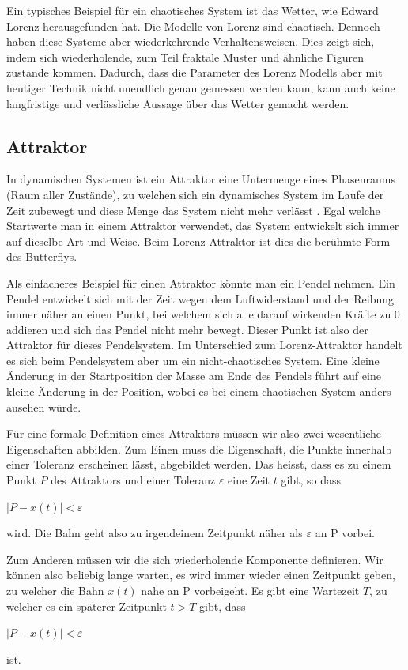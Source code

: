 Ein typisches Beispiel für ein chaotisches System ist das Wetter, wie Edward Lorenz herausgefunden hat. Die Modelle von Lorenz sind chaotisch. Dennoch haben diese Systeme aber	 wiederkehrende Verhaltensweisen. Dies zeigt sich, indem sich wiederholende, zum Teil fraktale Muster und ähnliche Figuren zustande kommen. Dadurch, dass die Parameter des Lorenz Modells aber mit heutiger Technik nicht unendlich genau gemessen werden kann, kann auch keine langfristige und verlässliche Aussage über das Wetter gemacht werden. 

\subsection{Attraktor}
In dynamischen Systemen ist ein Attraktor eine Untermenge eines Phasenraums (Raum aller Zustände), zu welchen sich ein dynamisches System im Laufe der Zeit zubewegt und diese Menge das System nicht mehr verlässt \cite{wikiattraktor}. 
Egal welche Startwerte man in einem Attraktor verwendet, das System entwickelt sich immer auf dieselbe Art und Weise. Beim Lorenz Attraktor ist dies die berühmte Form des Butterflys. 

Als einfacheres Beispiel für einen Attraktor könnte man ein Pendel nehmen. Ein Pendel entwickelt sich mit der Zeit wegen dem Luftwiderstand und der Reibung immer näher an einen Punkt, bei welchem sich alle darauf wirkenden Kräfte zu 0 addieren und sich das Pendel nicht mehr bewegt. Dieser Punkt ist also der Attraktor für dieses Pendelsystem. Im Unterschied zum Lorenz-Attraktor handelt es sich beim Pendelsystem aber um ein nicht-chaotisches System. Eine kleine Änderung in der Startposition der Masse am Ende des Pendels führt auf eine kleine Änderung in der Position, wobei es bei einem chaotischen System anders ausehen würde. 

Für eine formale Definition eines Attraktors müssen wir also zwei wesentliche Eigenschaften abbilden. Zum Einen muss die Eigenschaft, die Punkte innerhalb einer Toleranz erscheinen lässt, abgebildet werden. Das heisst, dass es zu einem Punkt $P$ des Attraktors  und einer Toleranz $\varepsilon$ eine Zeit $t$ gibt, so dass 

\begin{center}
	$|P - x(t)| < \varepsilon$
\end{center}
wird. Die Bahn geht also zu irgendeinem Zeitpunkt näher als $\varepsilon$ an P vorbei.

Zum Anderen müssen wir die sich wiederholende Komponente definieren. Wir können also beliebig lange warten, es wird immer wieder einen Zeitpunkt geben, zu welcher die Bahn $x(t)$ nahe an P vorbeigeht. Es gibt eine Wartezeit $T$, zu welcher es ein späterer Zeitpunkt $t > T$ gibt, dass
\begin{center}
	$|P - x(t) |< \varepsilon$
\end{center}
ist.

